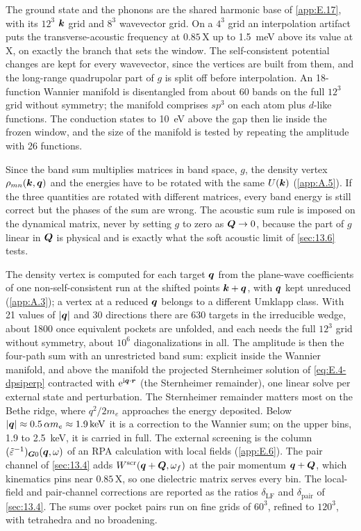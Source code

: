 The ground state and the phonons are the shared harmonic base of \cref{app:E.17}, with its $12^3$ $\bm{k}$ grid and $8^3$ wavevector grid. On a $4^3$ grid an interpolation artifact puts the transverse-acoustic frequency at $0.85\,\mathrm{X}$ up to \SI{1.5}{meV} above its value at X, on exactly the branch that sets the window. The self-consistent potential changes are kept for every wavevector, since the vertices are built from them, and the long-range quadrupolar part of $g$ is split off before interpolation. An 18-function Wannier manifold is disentangled from about 60 bands on the full $12^3$ grid without symmetry; the manifold comprises $sp^3$ on each atom plus $d$-like functions. The conduction states to \SI{10}{eV} above the gap then lie inside the frozen window, and the size of the manifold is tested by repeating the amplitude with 26 functions.

Since the band sum multiplies matrices in band space, $g$, the density vertex $\rho_{mn}(\bm{k},\bm{q})$ and the energies have to be rotated with the same $U(\bm{k})$ (\cref{app:A.5}). If the three quantities are rotated with different matrices, every band energy is still correct but the phases of the sum are wrong. The acoustic sum rule is imposed on the dynamical matrix, never by setting $g$ to zero as $\bm{Q}\to0$, because the part of $g$ linear in $\bm{Q}$ is physical and is exactly what the soft acoustic limit of \cref{sec:13.6} tests.

The density vertex is computed for each target $\bm{q}$ from the plane-wave coefficients of one non-self-consistent run at the shifted points $\bm{k}+\bm{q}$, with $\bm{q}$ kept unreduced (\cref{app:A.3}); a vertex at a reduced $\bm{q}$ belongs to a different Umklapp class. With 21 values of $|\bm{q}|$ and 30 directions there are 630 targets in the irreducible wedge, about 1800 once equivalent pockets are unfolded, and each needs the full $12^3$ grid without symmetry, about $10^6$ diagonalizations in all. The amplitude is then the four-path sum with an unrestricted band sum: explicit inside the Wannier manifold, and above the manifold the projected Sternheimer solution of \cref{eq:E.4-dpsiperp} contracted with $\mathrm{e}^{\mathrm{i}\bm{q}\cdot\bm{r}}$ (the Sternheimer remainder), one linear solve per external state and perturbation. The Sternheimer remainder matters most on the Bethe ridge, where $q^2/2m_e$ approaches the energy deposited. Below $|\bm{q}| \approx 0.5\,\alpha m_e \approx \SI{1.9}{keV}$ it is a correction to the Wannier sum; on the upper bins, 1.9 to \SI{2.5}{keV}, it is carried in full. The external screening is the column $(\tilde\varepsilon^{-1})_{\bm{G}0}(\bm{q},\omega)$ of an RPA calculation with local fields (\cref{app:E.6}). The pair channel of \cref{sec:13.4} adds $W^{\mathrm{scr}}(\bm{q}+\bm{Q},\omega_f)$ at the pair momentum $\bm{q}+\bm{Q}$, which kinematics pins near $0.85\,\mathrm{X}$, so one dielectric matrix serves every bin. The local-field and pair-channel corrections are reported as the ratios $\delta_{\mathrm{LF}}$ and $\delta_{\mathrm{pair}}$ of \cref{sec:13.4}. The sums over pocket pairs run on fine grids of $60^3$, refined to $120^3$, with tetrahedra and no broadening.

